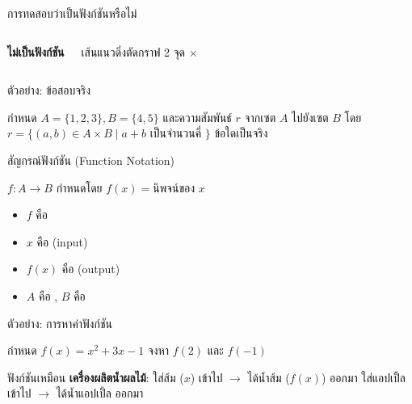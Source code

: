 \documentclass[11pt, aspectratio=169]{beamer}
\begin{document}
\begin{frame}{การทดสอบว่าเป็นฟังก์ชันหรือไม่}
\begin{columns}[T]
      \centering
      \textbf{ไม่เป็นฟังก์ชัน} \\[1em]
      \par เส้นแนวดิ่งตัดกราฟ 2 จุด $\times$
  \end{columns}
\end{frame}\begin{frame}[t]{ตัวอย่าง: ข้อสอบจริง}
  \begin{exambox}[โจทย์ปี 68 ข้อ 10]
    กำหนด $A=\{1,2,3\}, B=\{4,5\}$ และความสัมพันธ์ $r$ จากเซต $A$ ไปยังเซต $B$ โดย $r=\{(a,b)\in A\times B\mid a+b$ เป็นจำนวนคี่ $\}$ ข้อใดเป็นจริง \newline
    [ก. $r$ เป็นฟังก์ชัน]
  \end{exambox}

  \vspace{\fill}

\end{frame}\begin{frame}{สัญกรณ์ฟังก์ชัน (Function Notation)}
  \begin{explanation}[สัญกรณ์]
    $f: A \to B$ กำหนดโดย $f(x) = \text{นิพจน์ของ } x$

    \medskip
    \begin{itemize}
      \item $f$ คือ 
      \item $x$ คือ  (input)
      \item $f(x)$ คือ  (output)
      \item $A$ คือ , $B$ คือ 
    \end{itemize}
  \end{explanation}
\end{frame}\begin{frame}[t]{ตัวอย่าง: การหาค่าฟังก์ชัน}
  \begin{exambox}[โจทย์]
    กำหนด $f(x) = x^2 + 3x - 1$ จงหา $f(2)$ และ $f(-1)$
  \end{exambox}

  \begin{intuition}[สังเกต]
    ฟังก์ชันเหมือน \textbf{เครื่องผลิตนํ้าผลไม้}: \newline
    ใส่ส้ม ($x$) เข้าไป $\rightarrow$ ได้นํ้าส้ม ($f(x)$) ออกมา\newline 
    ใส่แอปเปิ้ล เข้าไป $\rightarrow$ ได้นํ้าแอปเปิ้ล ออกมา
  \end{intuition}


\end{frame}
\end{document}
